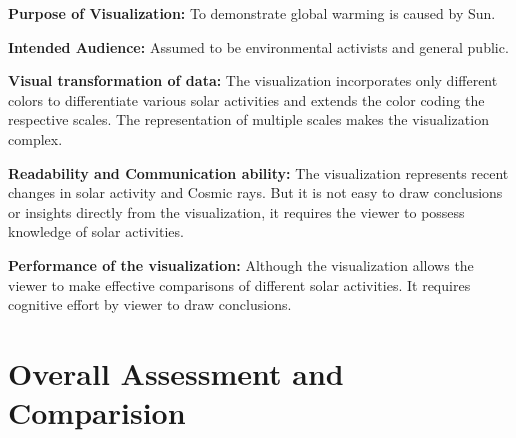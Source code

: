 \documentclass[]{book}
\begin{document}
\textbf{Purpose of Visualization:} To demonstrate global warming is caused by Sun.

\textbf{Intended Audience:} Assumed to be environmental activists and general public.

\textbf{Visual transformation of data:} The visualization incorporates only different colors to differentiate various solar activities and extends the color coding the respective scales. The representation of multiple scales makes the visualization complex.

\textbf{Readability and Communication ability:} The visualization represents recent changes in solar activity and Cosmic rays. But it is not easy to draw conclusions or insights directly from the visualization, it requires the viewer to possess knowledge of solar activities.

\textbf{Performance of the visualization:} Although the visualization allows the viewer to make effective comparisons of different solar activities. It requires cognitive effort by viewer to draw conclusions.

\hypertarget{overall-assessment-and-comparision}{%
\section{Overall Assessment and Comparision}\label{overall-assessment-and-comparision}}
\end{document}
